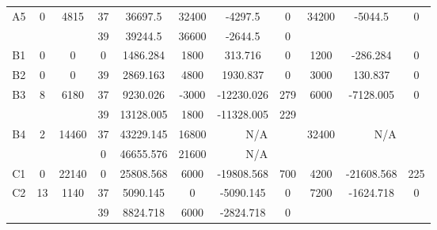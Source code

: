 \begin{sidewaystable}
\begin{tabular}{c||c|c||c|c|c|c|c||c|c|c}
         &
        
      \\
      \hline
      \multirow{2}{*}{A5} &
      \multirow{2}{*}{0} &
      \multirow{2}{*}{4815} &
      37 &
      36697.5 &
      32400 &
        -4297.5 &
        0 &
      \multirow{2}{*}{34200} &
        \multirow{2}{*}{-5044.5} &
        \multirow{2}{*}{0}
      \\
      \cline{4-8}
       &
       &
       &
      39 &
      39244.5 &
      36600 &
        -2644.5 &
        0 &
      
         &
        
      \\
      \hline
      \multirow{1}{*}{B1} &
      \multirow{1}{*}{0} &
      \multirow{1}{*}{0} &
      0 &
      1486.284 &
      1800 &
        313.716 &
        0 &
      \multirow{1}{*}{1200} &
        \multirow{1}{*}{-286.284} &
        \multirow{1}{*}{0}
      \\
      \hline
      \multirow{1}{*}{B2} &
      \multirow{1}{*}{0} &
      \multirow{1}{*}{0} &
      39 &
      2869.163 &
      4800 &
        1930.837 &
        0 &
      \multirow{1}{*}{3000} &
        \multirow{1}{*}{130.837} &
        \multirow{1}{*}{0}
      \\
      \hline
      \multirow{2}{*}{B3} &
      \multirow{2}{*}{8} &
      \multirow{2}{*}{6180} &
      37 &
      9230.026 &
      -3000 &
        -12230.026 &
        279 &
      \multirow{2}{*}{6000} &
        \multirow{2}{*}{-7128.005} &
        \multirow{2}{*}{0}
      \\
      \cline{4-8}
       &
       &
       &
      39 &
      13128.005 &
      1800 &
        -11328.005 &
        229 &
      
         &
        
      \\
      \hline
      \multirow{2}{*}{B4} &
      \multirow{2}{*}{2} &
      \multirow{2}{*}{14460} &
      37 &
      43229.145 &
      16800 &
        \multicolumn{2}{|c||}{N/A} &
      \multirow{2}{*}{32400} &
        \multicolumn{2}{c}{\multirow{2}{*}{N/A}}
      \\
      \cline{4-8}
       &
       &
       &
      0 &
      46655.576 &
      21600 &
        \multicolumn{2}{|c||}{N/A} &
      
        
      \\
      \hline
      \multirow{1}{*}{C1} &
      \multirow{1}{*}{0} &
      \multirow{1}{*}{22140} &
      0 &
      25808.568 &
      6000 &
        -19808.568 &
        700 &
      \multirow{1}{*}{4200} &
        \multirow{1}{*}{-21608.568} &
        \multirow{1}{*}{225}
      \\
      \hline
      \multirow{2}{*}{C2} &
      \multirow{2}{*}{13} &
      \multirow{2}{*}{1140} &
      37 &
      5090.145 &
      0 &
        -5090.145 &
        0 &
      \multirow{2}{*}{7200} &
        \multirow{2}{*}{-1624.718} &
        \multirow{2}{*}{0}
      \\
      \cline{4-8}
       &
       &
       &
      39 &
      8824.718 &
      6000 &
        -2824.718 &
        0 &
      

\end{tabular}
\end{sidewaystable}
